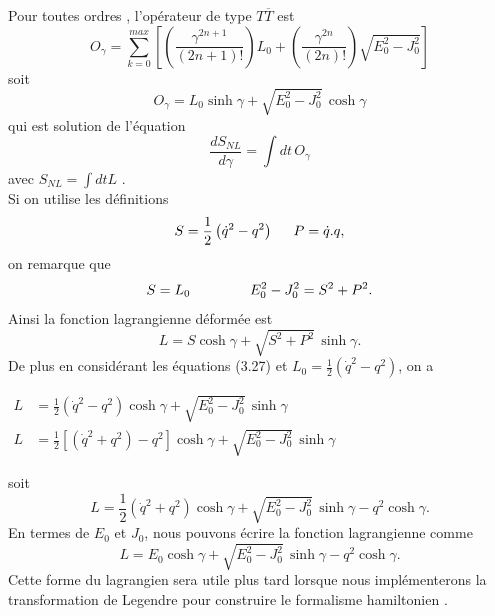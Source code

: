 \documentclass[12pt,a4paper, openany]{report}
\begin{document}
	Pour toutes ordres , l'opérateur de type $T{\overline{T}}$ est 
	\begin{equation}
		O_{\gamma}=\sum_{k=0}^{max}\left[\left(\frac{\gamma^{2n+1}}{(2n+1)!}\right)L_0+\left(\frac{\gamma^{2n}}{(2n)!}\right)\sqrt{E^2_0-J_0^2}\right]
	\end{equation}
    soit
    \begin{equation}
    	O_{\gamma}=	L_0\sinh{\gamma} +\sqrt{E^2_0-J_0^2}\, \cosh{\gamma}
    \end{equation}
	qui est solution de l'équation %
	\begin{equation}
		\frac{dS_{NL}}{d{\gamma}}=\int dt\,O_{\gamma}
	\end{equation}
	avec $S_{NL}=\int dt L$ .\\
	Si on utilise les définitions 
	\begin{equation}
		S=\frac{1}{2}\left(\dot{q}^{2}-q^{2}\right) \hspace{0.5cm} P=\dot{q}.q ,
	\end{equation}
	on remarque que 
	\begin{equation}
		S=L_0 \hspace{1.5cm} E^2_0-J_0^2=S^2+P^2 .
	\end{equation}
	Ainsi la fonction lagrangienne déformée est 
	\begin{equation}
		L=S\cosh{\gamma}+\sqrt{S^2+P^2}\,\sinh{\gamma} .
	\end{equation}
	De plus en considérant les équations (3.27) et $L_0=\frac{1}{2}\left(\dot{q}^{2}-q^{2}\right)$, on a \\
	\begin{center}
		$\left.\begin{aligned}
			L&=\frac{1}{2}\left(\dot{q}^{2}-q^{2}\right)\cosh{\gamma}+\sqrt{E^2_0-J_0^2}\,\sinh{\gamma}\\
			L&=\frac{1}{2}\left[\left(\dot{q}^{2}+q^{2}\right)-q^{2}\right]\cosh{\gamma}+\sqrt{E^2_0-J_0^2}\,\sinh{\gamma}
		\end{aligned}\right.$
	\end{center}
	soit 
	\begin{equation}
		L=\frac{1}{2}\left(\dot{q}^{2}+q^{2}\right)\cosh{\gamma}+\sqrt{E^2_0-J_0^2}\,\sinh{\gamma}-q^{2}\cosh{\gamma}.	
	\end{equation}
	En termes de $E_0$ et $J_0$, nous pouvons écrire la fonction lagrangienne comme 
	\begin{equation}
		L=E_0\cosh{\gamma}+\sqrt{E^2_0-J_0^2}\,\sinh{\gamma}-q^{2}\cosh{\gamma} .	
	\end{equation}
    Cette forme du lagrangien sera utile plus tard lorsque nous implémenterons la transformation de Legendre pour construire le formalisme hamiltonien .
\end{document}
